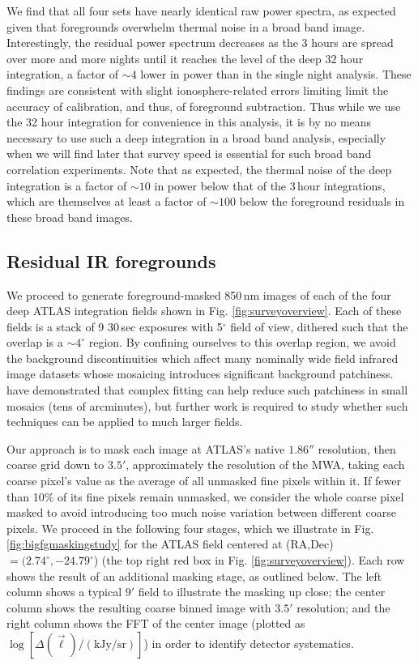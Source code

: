 \documentclass[numberedappendix]{emulateapj}
\begin{document}
We find that all four sets have nearly identical raw power spectra, as expected given that foregrounds overwhelm thermal noise in a broad band image. Interestingly, the residual power spectrum decreases as the 3 hours are spread over more and more nights until it reaches the level of the deep 32 hour integration, a factor of $\sim4$ lower in power than in the single night analysis. These findings are consistent with slight ionosphere-related errors limiting limit the accuracy of calibration, and thus, of foreground subtraction. Thus while we use the 32 hour integration for convenience in this analysis, it is by no means necessary to use such a deep integration in a broad band analysis, especially when we will find later that survey speed is essential for such broad band correlation experiments. Note that as expected, the thermal noise of the deep integration is a factor of $\sim10$ in power below that of the 3\,hour integrations, which are themselves at least a factor of $\sim100$ below the foreground residuals in these broad band images.

\subsection{Residual IR foregrounds}
\label{sec:resirfg}

We proceed to generate foreground-masked 850\,nm images of each of the four deep ATLAS integration fields shown in Fig. \ref{fig:surveyoverview}. Each of these fields is a stack of 9 30\,sec exposures with 5$^\circ$ field of view, dithered such that the overlap is a $\sim4^\circ$ region. By confining ourselves to this overlap region, we avoid the background discontinuities which affect many nominally wide field infrared image datasets whose mosaicing introduces significant background patchiness. \citet{mw15} have demonstrated that complex fitting \citep{fixen00} can help reduce such patchiness in small mosaics (tens of arcminutes), but further work is required to study whether such techniques can be applied to much larger fields.

Our approach is to mask each image at ATLAS's native $1.86''$ resolution, then coarse grid down to $3.5'$, approximately the resolution of the MWA, taking each coarse pixel's value as the average of all unmasked fine pixels within it. If fewer than 10\% of its fine pixels remain unmasked, we consider the whole coarse pixel masked to avoid introducing too much noise variation between different coarse pixels. We proceed in the following four stages, which we illustrate in Fig. \ref{fig:bigfgmaskingstudy} for the ATLAS field centered at (RA,Dec)$=(2.74^\circ, -24.79^\circ$) (the top right red box in Fig. \ref{fig:surveyoverview}). Each row shows the result of an additional masking stage, as outlined below. The left column shows a typical $9'$ field to illustrate the masking up close; the center column shows the resulting coarse binned image with $3.5'$ resolution; and the right column shows the FFT of the center image (plotted as $\log[\Delta(\vec{\ell})/(\text{kJy/sr})]$) in order to identify detector systematics. 
\end{document}
